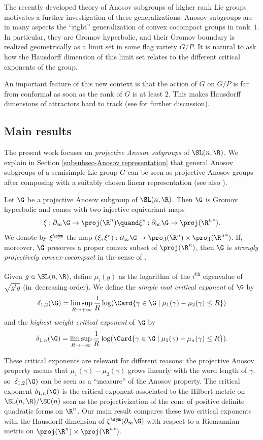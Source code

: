 The recently developed theory of Anosov subgroups of higher rank Lie groups motivates a further investigation of these generalizations. Anosov subgroups are in many aspects the ``right'' generalization of convex cocompact groups in rank~$1$. In particular, they are Gromov hyperbolic, and their Gromov boundary is realized geometrically as a limit set in some flag variety $G/P$. It is natural to ask how the Hausdorff dimension of this limit set relates to the different critical exponents of the group.

An important feature of this new context is that the action of $G$ on $G/P$ is far from conformal as soon as the rank of $G$ is at least $2$. This makes Hausdorff dimensions of attractors hard to track (see \cite{PSW19} for further discussion).

\subsection{Main results}

The present work focuses on \emph{projective Anosov subgroups} of $\SL(n,\R)$. We explain in Section \ref{subsubsec-Anosov representation} that general Anosov subgroups of a semisimple Lie group $G$ can be seen as projective Anosov groups after composing with a suitably chosen linear representation (see also \cite[\S 3.3]{gueritaud20017anosov}).

Let $\G$ be a projective Anosov subgroup of $\SL(n,\R)$. Then $\G$ is Gromov hyperbolic and comes with two injective equivariant maps
\[
\xi : \partial_\infty \G \to \proj (\R^n)\quand \xi^* : \partial_\infty \G \to \proj ({\R^n}^*).
\]
We denote by $\xi^{\sym}$ the map $(\xi,\xi^*): \partial_\infty \G \to \proj (\R^n) \times \proj({\R^n}^*)$. If, moreover, $\G$ preserves a proper convex subset of $\proj(\R^n)$, then $\G$ is \emph{strongly projectively convex-cocompact} in the sense of \cite{DGK}.

Given $g\in \SL(n,\R)$, define $\mu_i(g)$ as the logarithm of the $i$\textsuperscript{th} eigenvalue of $\sqrt{g^t g}$ (in~decreasing order). We define the \emph{simple root critical exponent} of $\G$ by
\[\delta_{1,2}(\G) = \limsup_{R\to +\infty} \frac{1}{R} \log(\Card \{\gamma \in \G \mid \mu_1(\gamma) - \mu_2(\gamma) \leq R\})\]
and the \emph{highest weight critical exponent} of $\G$ by
\[\delta_{1,n}(\G) = \limsup_{R\to +\infty} \frac{1}{R} \log(\Card \{\gamma \in \G \mid \mu_1(\gamma) - \mu_n(\gamma) \leq R\}).
\]

These critical exponents are relevant for different reasons: the projective Anosov property means that $\mu_1(\gamma) - \mu_2(\gamma)$ grows linearly with the word length of $\gamma$, so~$\delta_{1,2}(\G)$ can be seen as a ``measure'' of the Anosov property. The critical exponent $\delta_{1,n}(\G)$ is the critical exponent associated to the Hilbert metric on $\SL(n,\R)/\SO(n)$ seen as the projectivization of the cone of positive definite quadratic forms on $\R^n$. Our main result compares these two critical exponents with the Hausdorff dimension of $\xi^{\sym}(\partial_\infty \G)$ with respect to a Riemannian metric on $\proj (\R^n) \times \proj({\R^n}^*)$.


